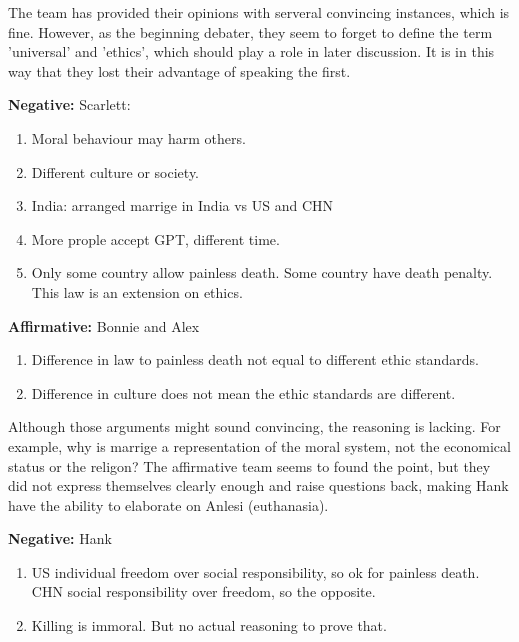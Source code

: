 \documentclass[12pt]{article}
\newcommand{\affirmative}[1]{{\color{affirmcolor}\textbf{Affirmative:} #1}}
\newcommand{\negative}[1]{{\color{negcolor}\textbf{Negative:} #1}}
\begin{document}
\begin{tcolorbox}[title = Note on affirmative team]
    The team has provided their opinions with serveral convincing instances, which is fine. However, as the beginning debater, they seem to forget to define the term 'universal' and 'ethics', which should play a role in later discussion. It is in this way that they lost their advantage of speaking the first.
\end{tcolorbox}

\negative{Scarlett:
\begin{enumerate}
    \item Moral behaviour may harm others. 
    \item Different culture or society. 
    \item India: arranged marrige in India vs US and CHN 
    \item More prople accept GPT, different time.
    \item Only some country allow painless death. Some country have death penalty. This law is an extension on ethics.
\end{enumerate}}

\affirmative{Bonnie and Alex
    \begin{enumerate}
        \item Difference in law to painless death not equal to different ethic standards.
        \item Difference in culture does not mean the ethic standards are different.
    \end{enumerate}
}

\begin{tcolorbox}[title = Note on both teams]
    Although those arguments might sound convincing, the reasoning is lacking. For example, why is marrige a representation of the moral system, not the economical status or the religon? The affirmative team seems to found the point, but they did not express themselves clearly enough and raise questions back, making Hank have the ability to elaborate on Anlesi (euthanasia).
\end{tcolorbox}

\negative{Hank
\begin{enumerate}
    \item US individual freedom over social responsibility, so ok for painless death. CHN social responsibility over freedom, so the opposite.
    \item Killing is immoral. But no actual reasoning to prove that.
\end{enumerate}
}
\end{document}
